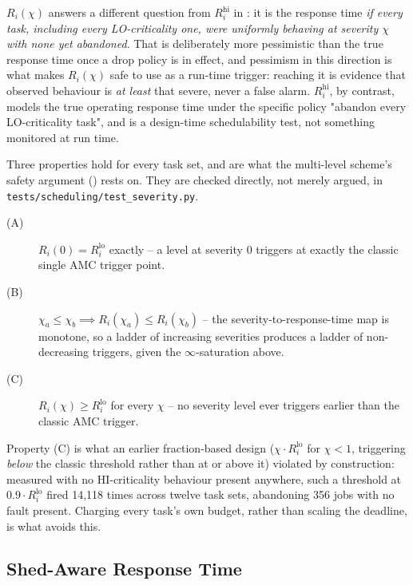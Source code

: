 $R_i(\chi)$ answers a different question from $R_i^{\mathrm{hi}}$ in
: it is the response time \emph{if every task, including
every LO-criticality one, were uniformly behaving at severity $\chi$ with none
yet abandoned}. That is deliberately more pessimistic than the true response
time once a drop policy is in effect, and pessimism in this direction is what
makes $R_i(\chi)$ safe to use as a run-time trigger: reaching it is evidence
that observed behaviour is \emph{at least} that severe, never a false alarm.
$R_i^{\mathrm{hi}}$, by contrast, models the true operating response time under
the specific policy "abandon every LO-criticality task", and is a design-time
schedulability test, not something monitored at run time.

Three properties hold for every task set, and are what the multi-level
scheme's safety argument () rests on. They are checked
directly, not merely argued, in \texttt{tests/scheduling/test\_severity.py}.

\begin{description}
\item[(A)] $R_i(0) = R_i^{\mathrm{lo}}$ exactly -- a level at severity $0$
  triggers at exactly the classic single AMC trigger point.
\item[(B)] $\chi_a \leq \chi_b \implies R_i(\chi_a) \leq R_i(\chi_b)$ -- the
  severity-to-response-time map is monotone, so a ladder of increasing
  severities produces a ladder of non-decreasing triggers, given the
  $\infty$-saturation above.
\item[(C)] $R_i(\chi) \geq R_i^{\mathrm{lo}}$ for every $\chi$ -- no severity
  level ever triggers earlier than the classic AMC trigger.
\end{description}
\label{prop:c}

Property (C) is what an earlier fraction-based design ($\chi \cdot
R_i^{\mathrm{lo}}$ for $\chi < 1$, triggering \emph{below} the classic
threshold rather than at or above it) violated by construction: measured with
no HI-criticality behaviour present anywhere, such a threshold at $0.9 \cdot
R_i^{\mathrm{lo}}$ fired 14{,}118 times across twelve task sets, abandoning 356
jobs with no fault present. Charging every task's own budget, rather than
scaling the deadline, is what avoids this.

\subsection{Shed-Aware Response Time}
\label{sec:shed-aware}

